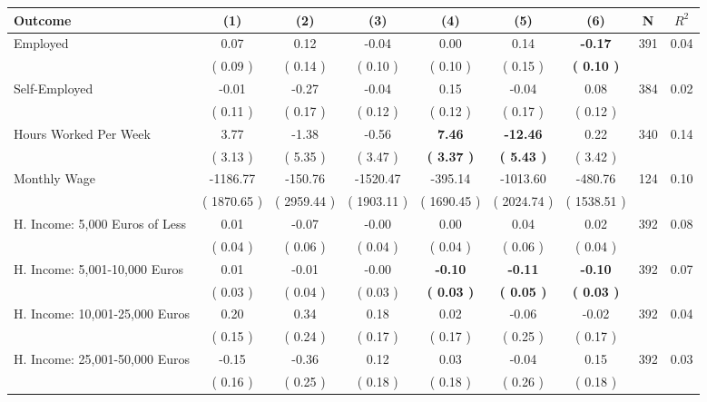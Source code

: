 \begin{tabular}{lcccccccc}
\toprule
 \textbf{Outcome} & \textbf{(1)} & \textbf{(2)} & \textbf{(3)} & \textbf{(4)} & \textbf{(5)} & \textbf{(6)} & \textbf{N} & \textbf{$ R^2$} \\
\midrule
Employed &      0.07 &      0.12 &     -0.04 &      0.00 &      0.14 & \textbf{    -0.17} & 391 &       0.04 \\ 
 & (     0.09 ) & (     0.14 ) & (     0.10 ) & (     0.10 ) & (     0.15 ) & \textbf{(     0.10 )} & \\
Self-Employed &     -0.01 &     -0.27 &     -0.04 &      0.15 &     -0.04 &      0.08 & 384 &       0.02 \\ 
 & (     0.11 ) & (     0.17 ) & (     0.12 ) & (     0.12 ) & (     0.17 ) & (     0.12 ) & \\
Hours Worked Per Week &      3.77 &     -1.38 &     -0.56 & \textbf{     7.46} & \textbf{   -12.46} &      0.22 & 340 &       0.14 \\ 
 & (     3.13 ) & (     5.35 ) & (     3.47 ) & \textbf{(     3.37 )} & \textbf{(     5.43 )} & (     3.42 ) & \\
Monthly Wage &  -1186.77 &   -150.76 &  -1520.47 &   -395.14 &  -1013.60 &   -480.76 & 124 &       0.10 \\ 
 & (  1870.65 ) & (  2959.44 ) & (  1903.11 ) & (  1690.45 ) & (  2024.74 ) & (  1538.51 ) & \\
H. Income: 5,000 Euros of Less &      0.01 &     -0.07 &     -0.00 &      0.00 &      0.04 &      0.02 & 392 &       0.08 \\ 
 & (     0.04 ) & (     0.06 ) & (     0.04 ) & (     0.04 ) & (     0.06 ) & (     0.04 ) & \\
H. Income: 5,001-10,000 Euros &      0.01 &     -0.01 &     -0.00 & \textbf{    -0.10} & \textbf{    -0.11} & \textbf{    -0.10} & 392 &       0.07 \\ 
 & (     0.03 ) & (     0.04 ) & (     0.03 ) & \textbf{(     0.03 )} & \textbf{(     0.05 )} & \textbf{(     0.03 )} & \\
H. Income: 10,001-25,000 Euros &      0.20 &      0.34 &      0.18 &      0.02 &     -0.06 &     -0.02 & 392 &       0.04 \\ 
 & (     0.15 ) & (     0.24 ) & (     0.17 ) & (     0.17 ) & (     0.25 ) & (     0.17 ) & \\
H. Income: 25,001-50,000 Euros &     -0.15 &     -0.36 &      0.12 &      0.03 &     -0.04 &      0.15 & 392 &       0.03 \\ 
 & (     0.16 ) & (     0.25 ) & (     0.18 ) & (     0.18 ) & (     0.26 ) & (     0.18 ) & \\

\end{tabular}
